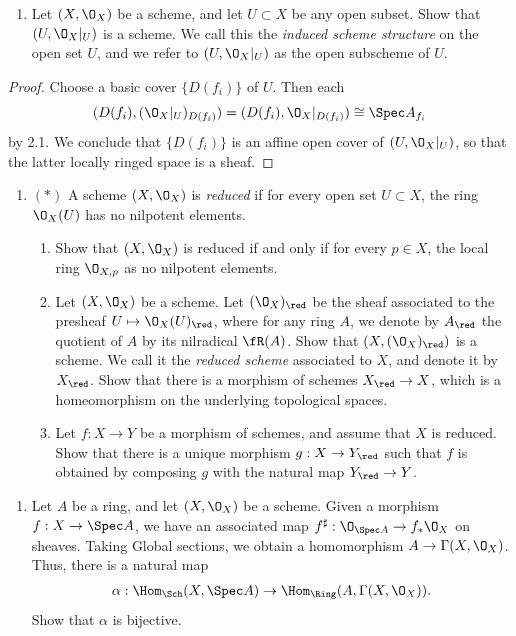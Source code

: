 \documentclass[12pt]{amsart}
\begin{document}
\begin{enumerate}
	\item[2.2.] {
      Let $(X,\O_X)$ be a scheme, and let $U\subset X$ be any open subset.
      Show that $(U,\O_X|_U)$ is a scheme.
      We call this the \emph{induced scheme structure} on the open set $U$, and we refer to $(U,\O_X|_U)$ as the open subscheme of $U$.
    }
\end{enumerate}

\begin{proof}
  Choose a basic cover $\{D(f_i)\}$ of $U$. 
  Then each 
  \[
    (D(f_i),(\O_X|_U)_{D(f_i)})= (D(f_i),\O_X|_{D(f_i)})\cong\Spec A_{f_i}
  \]
  by 2.1. 
  We conclude that $\{D(f_i)\}$ is an affine open cover of $(U,\O_X|_U)$, so that the latter locally ringed space is a sheaf.
\end{proof}


\begin{enumerate}
	\item[2.3.] {
      $(*)$ A scheme $(X,\O_X)$ is \emph{reduced} if for every open set $U\subset X$, the ring $\O_X(U)$ has no nilpotent elements.
      \begin{enumerate}
        \item Show that $(X,\O_X)$ is reduced if and only if for every $p\in X$, the local ring $\O_{X,p}$ as no nilpotent elements.
        \item Let $(X,\O_X)$ be a scheme.
          Let $(\O_X)_{\red}$ be the sheaf associated to the presheaf $U\mapsto \O_X(U)_{\red}$, where for any ring $A$, we denote by $A_{\red}$ the quotient of $A$ by its nilradical $\fR(A)$. 
          Show that $(X,(\O_X)_{\red})$ is a scheme.
          We call it the \emph{reduced scheme} associated to $X$, and denote it by $X_{\red}$.
          Show that there is a morphism of schemes $X_{\red}\to X$, which is a homeomorphism on the underlying topological spaces.
        \item Let $f:X\to Y$ be a morphism of schemes, and assume that $X$ is reduced.
          Show that there is a unique morphism $g:X\to Y_{\red}$ such that $f$ is obtained by composing $g$ with the natural map $Y_{\red}\to Y$.
      \end{enumerate}
    }
\end{enumerate}

\begin{enumerate}
	\item[2.4.] {
      Let $A$ be a ring, and let $(X,\O_X)$ be a scheme.
      Given a morphism $f:X\to\Spec A$, we have an associated map $f^\sharp:\O_{\Spec A}\to f_*\O_X$ on sheaves.
      Taking Global sections, we obtain a homomorphism $A\to\Gamma(X,\O_X)$.
      Thus, there is a natural map
      \begin{align*}
        \alpha:\Hom_{\Sch}(X,\Spec A)\to \Hom_{\Ring}(A,\Gamma(X,\O_X)).
      \end{align*}
      Show that $\alpha$ is bijective.
    }
\end{enumerate}
\end{document}
